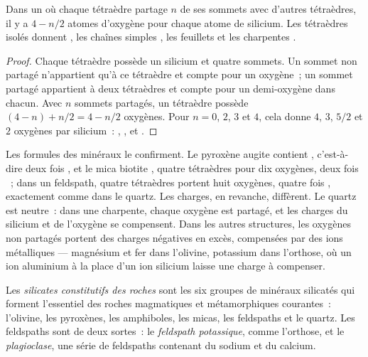 
\begin{proposition}\label{prop:g11:minerals:sharing}
Dans un  où chaque tétraèdre partage $n$ de ses sommets avec
d'autres tétraèdres, il y a $4 - n/2$ atomes d'oxygène pour chaque atome de
silicium. Les tétraèdres isolés donnent , les chaînes simples
, les feuillets  et les charpentes .
\end{proposition}

\begin{proof}
Chaque tétraèdre possède un silicium et quatre sommets. Un sommet non
partagé n'appartient qu'à ce tétraèdre et compte pour un oxygène~; un
sommet partagé appartient à deux tétraèdres et compte pour un demi-oxygène
dans chacun. Avec $n$ sommets partagés, un tétraèdre possède
$(4 - n) + n/2 = 4 - n/2$ oxygènes.
Pour $n = 0$, $2$, $3$ et $4$, cela donne $4$, $3$, $5/2$ et $2$ oxygènes
par silicium~: , ,  et .
\end{proof}

Les formules des minéraux le confirment. Le pyroxène augite contient
, c'est-à-dire deux fois , et le mica biotite
, quatre tétraèdres pour dix oxygènes, deux fois ~;
dans un feldspath, quatre tétraèdres portent huit oxygènes, quatre fois
, exactement comme dans le quartz. Les charges, en revanche,
diffèrent. Le quartz est neutre~: dans une charpente, chaque oxygène est
partagé, et les charges du silicium et de l'oxygène se compensent. Dans les
autres structures, les oxygènes non partagés portent des charges négatives
en excès, compensées par des ions métalliques --- magnésium et fer dans
l'olivine, potassium dans l'orthose, où un ion aluminium  à la
place d'un ion silicium  laisse une charge à compenser.

\begin{definition}\label{def:g11:minerals:rock-forming}
Les \emph{silicates constitutifs des roches}
sont les six groupes de minéraux silicatés qui forment l'essentiel
des roches magmatiques et métamorphiques courantes~: l'olivine, les
pyroxènes, les amphiboles, les micas, les feldspaths et le quartz. Les
feldspaths sont de deux sortes~: le \emph{feldspath potassique}, comme
l'orthose, et le \emph{plagioclase}, une série de feldspaths contenant du
sodium et du calcium.
\end{definition}

